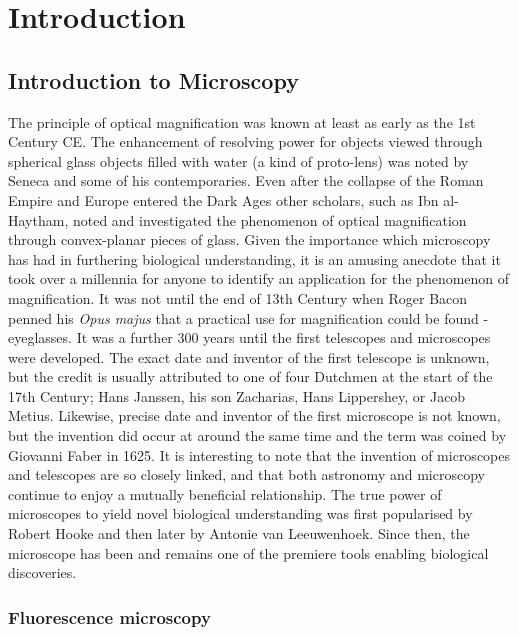 \chapter{Introduction}

\section{Introduction to Microscopy}
\label{sec:microscopy}

The principle of optical magnification was known at least as early as the 1st 
Century CE. The enhancement of resolving power for objects viewed through 
spherical glass objects filled with water (a kind of proto-lens) was noted by 
Seneca and some of his contemporaries\cite{seneca1971naturales}. Even after 
the collapse of the Roman Empire and Europe entered the Dark Ages other 
scholars, such as Ibn al-Haytham, noted and investigated the phenomenon of 
optical magnification through convex-planar pieces of 
glass\cite{nasr1968science}. Given the importance which microscopy has had in 
furthering biological understanding, it is an amusing anecdote that it took 
over a millennia for anyone to identify an application for the phenomenon of 
magnification. It was not until the end of 13th Century  when Roger Bacon 
penned his \textit{Opus majus} that a practical use for magnification could 
be found - eyeglasses. It was a further 300 years until the first telescopes 
and microscopes were developed. The exact date and inventor of the first 
telescope is unknown, but the credit is usually attributed to one of four 
Dutchmen at the start of the 17th Century; Hans Janssen, his son Zacharias, 
Hans Lippershey, or Jacob Metius. Likewise, precise date and inventor of the 
first microscope is not known, but the invention did occur at around the same 
time and the term was coined by Giovanni Faber in 
1625\cite{bardell2004invention}. It is interesting to note that the invention 
of microscopes and telescopes are so closely linked, and that both astronomy 
and microscopy continue to enjoy a mutually beneficial relationship. The true 
power of microscopes to yield novel biological understanding was first 
popularised by Robert Hooke and then later by Antonie van 
Leeuwenhoek\cite{hooke1665micrographia, chung2017pioneers}. Since then, the 
microscope has been and remains one of the premiere tools enabling biological 
discoveries.

\subsection{Fluorescence microscopy}
\label{subsec:fluorescence}

